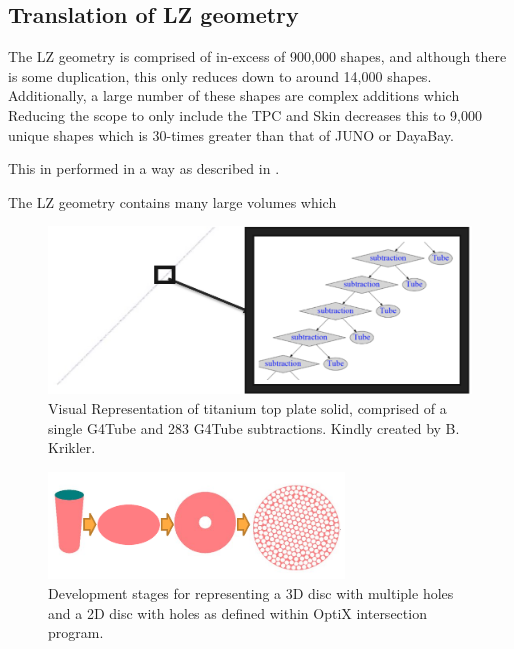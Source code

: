 \subsection{Translation of LZ geometry}
\par
The LZ geometry is comprised of in-excess of 900,000 shapes, and although there is some duplication, this only reduces down to around 14,000 shapes.
Additionally, a large number of these shapes are complex additions which 
Reducing the scope to only include the TPC and Skin decreases this to 9,000 unique shapes which is 30-times greater than that of JUNO or DayaBay.
\par
This in performed in a way as described in \cite{CSG_Intersection_ref}.

\par
The LZ geometry contains many large volumes which


\begin{figure}[!htbp]
\includegraphics[width=\textwidth]{Figures/Simulations/unbalanced_ptfe.png}
\centering
\caption{Visual Representation of titanium top plate solid, comprised of a single G4Tube and 283 G4Tube subtractions. Kindly created by B. Krikler.}
\label{fig:Opticks_unbalanced_shape}
\end{figure}



\begin{figure}[!htbp]
\includegraphics[width=0.7\textwidth]{Figures/Simulations/opticks_PTFE_primative.png}
\centering
\caption{Development stages for representing a 3D disc with multiple holes and a 2D disc with holes as defined within OptiX intersection program.}
\label{fig:Opticks_PTFE_primative}
\end{figure}


